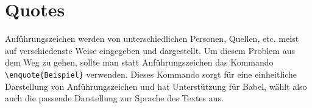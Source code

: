 \section{Quotes}
\label{sec:quotes}

Anführungszeichen werden von unterschiedlichen Personen, Quellen, etc. meist
auf verschiedenste Weise eingegeben und dargestellt. Um diesem Problem aus dem
Weg zu gehen, sollte man statt Anführungszeichen das Kommando
\texttt{\textbackslash{}enquote\{Beispiel\}} verwenden.
Dieses Kommando sorgt für eine einheitliche Darstellung von Anführungszeichen
und hat Unterstützung für Babel, wählt also auch die passende Darstellung zur
Sprache des Textes aus.
